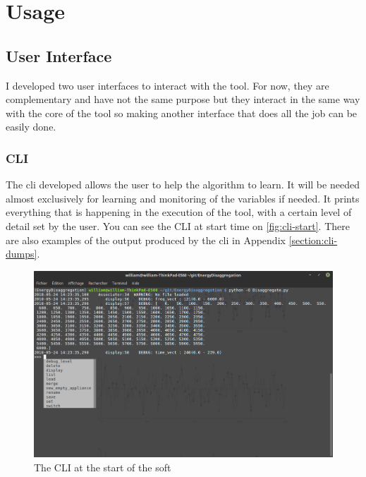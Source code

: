 \chapter{Usage}
\section{User Interface}
I developed two user interfaces to interact with the tool. For now, they are complementary and have not the same purpose but they interact in the same way with the core of the tool so making another interface that does all the job can be easily done.
\subsection{CLI}
The \acrlong{cli} developed allows the user to help the algorithm to learn. It will be needed almost exclusively for learning and monitoring of the variables if needed. It prints everything that is happening in the execution of the tool, with a certain level of detail set by the user. You can see the CLI at start time on \autoref{fig:cli-start}. There are also examples of the output produced by the \acrshort{cli} in Appendix \ref{section:cli-dumps}.
\begin{figure}
    \centering
    \includegraphics[width=\textwidth]{img/cli-start.png}
    \caption{The CLI at the start of the soft}
    \label{fig:cli-start}
\end{figure}

